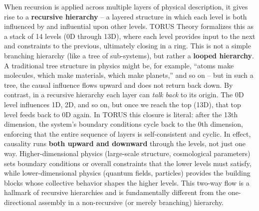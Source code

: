 \documentclass[]{article}
\begin{document}
{When recursion is applied across multiple layers of physical
description, it gives rise to a \textbf{recursive hierarchy} -- a
layered structure in which each level is both influenced by and
influential upon other levels. TORUS Theory formalizes this as a stack
of 14 levels (0D through 13D), where each level provides input to the
next and constraints to the previous, ultimately closing in a ring. This
is not a simple branching hierarchy (like a tree of sub-systems), but
rather a \textbf{looped hierarchy}. A traditional tree structure in
physics might be, for example, ``atoms make molecules, which make
materials, which make planets,'' and so on -- but in such a tree, the
causal influence flows upward and does not return back down. By
contrast, in a recursive hierarchy each layer can \emph{talk back} to
its origin. The 0D level influences 1D, 2D, and so on, but once we reach
the top (13D), that top level feeds back to 0D again​. In TORUS this
closure is literal: after the 13th dimension, the system's boundary
conditions cycle back to the 0th dimension, enforcing that the entire
sequence of layers is self-consistent and cyclic. In effect, causality
runs \textbf{both upward and downward} through the levels, not just one
way. Higher-dimensional physics (large-scale structure, cosmological
parameters) sets boundary conditions or overall constraints that the
lower levels must satisfy, while lower-dimensional physics (quantum
fields, particles) provides the building blocks whose collective
behavior shapes the higher levels. This two-way flow is a hallmark of
recursive hierarchies and is fundamentally different from the
one-directional assembly in a non-recursive (or merely branching)
hierarchy.

}
\end{document}
